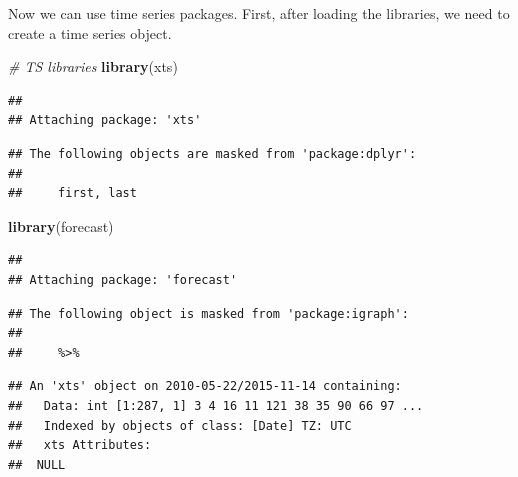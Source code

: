 \documentclass[]{book}
\newenvironment{Shaded}{\begin{snugshade}}{\end{snugshade}}
\newcommand{\KeywordTok}[1]{\textcolor[rgb]{0.13,0.29,0.53}{\textbf{{#1}}}}
\newcommand{\DataTypeTok}[1]{\textcolor[rgb]{0.13,0.29,0.53}{{#1}}}
\newcommand{\StringTok}[1]{\textcolor[rgb]{0.31,0.60,0.02}{{#1}}}
\newcommand{\CommentTok}[1]{\textcolor[rgb]{0.56,0.35,0.01}{\textit{{#1}}}}
\newcommand{\NormalTok}[1]{{#1}}
\begin{document}
Now we can use time series packages. First, after loading the libraries,
we need to create a time series object.

\begin{Shaded}
\begin{Highlighting}[]
\CommentTok{# TS libraries}
\KeywordTok{library}\NormalTok{(xts)}
\end{Highlighting}
\end{Shaded}

\begin{verbatim}
## 
## Attaching package: 'xts'
\end{verbatim}

\begin{verbatim}
## The following objects are masked from 'package:dplyr':
## 
##     first, last
\end{verbatim}

\begin{Shaded}
\begin{Highlighting}[]
\KeywordTok{library}\NormalTok{(forecast)}
\end{Highlighting}
\end{Shaded}

\begin{verbatim}
## 
## Attaching package: 'forecast'
\end{verbatim}

\begin{verbatim}
## The following object is masked from 'package:igraph':
## 
##     %>%
\end{verbatim}

\begin{Shaded}
\end{Shaded}

\begin{verbatim}
## An 'xts' object on 2010-05-22/2015-11-14 containing:
##   Data: int [1:287, 1] 3 4 16 11 121 38 35 90 66 97 ...
##   Indexed by objects of class: [Date] TZ: UTC
##   xts Attributes:  
##  NULL
\end{verbatim}
\end{document}
